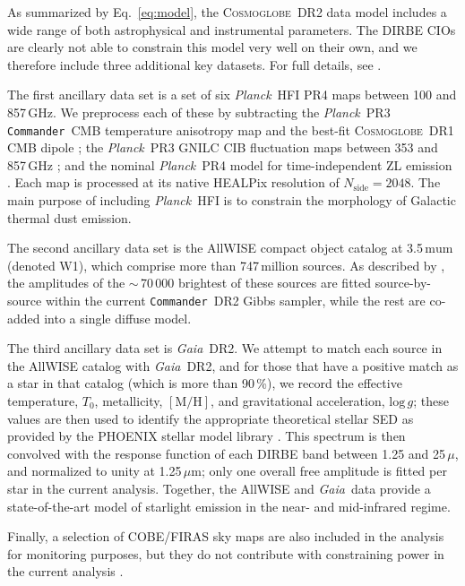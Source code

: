 \documentclass[twocolumn]{aa}
\def\commander{\texttt{Commander}}
\def\Planck{\textit{Planck}}
\def\GAIA{\textit{Gaia}}
\newcommand{\cosmoglobe}{\textsc{Cosmoglobe}}
\begin{document}
As summarized by Eq.~\eqref{eq:model}, the \cosmoglobe\ DR2 data model
includes a wide range of both astrophysical and instrumental
parameters. The DIRBE CIOs are clearly not able to constrain this
model very well on their own, and we therefore include three
additional key datasets. For full details, see
\citet{CG02_01,CG02_03,CG02_04,CG02_05}.

The first ancillary data set is a set of six \Planck\ HFI PR4 maps
between 100 and 857\,GHz. We preprocess each of these by subtracting
the \Planck\ PR3 \commander\ CMB temperature anisotropy map
\citep{planck2014-a12} and the best-fit \cosmoglobe\ DR1 CMB dipole
\citep{Watts2023}; the \Planck\ PR3 GNILC CIB fluctuation maps between
353 and 857\,GHz \citep{gnilc_cib}; and the nominal \Planck\ PR4 model
for time-independent ZL emission \citep{npipe}. Each map is processed
at its native HEALPix resolution of $N_{\mathrm{side}}=2048$. The main
purpose of including \Planck\ HFI is to constrain the morphology of
Galactic thermal dust emission.

The second ancillary data set is the AllWISE
\citep{wright:2010,allwise_ES} compact object catalog at
3.5$\,\mathrm{mu}$m (denoted W1), which comprise more than
747\,million sources. As described by \citet{CG02_04}, the amplitudes
of the $\sim$\,70\,000 brightest of these sources are fitted
source-by-source within the current \commander\ DR2 Gibbs sampler,
while the rest are co-added into a single diffuse model.

The third ancillary data set is \GAIA\ DR2. We attempt to match each
source in the AllWISE catalog with \GAIA\ DR2, and for those that have a
positive match as a star in that catalog (which is more than 90\,\%),
we record the effective temperature, $T_0$, metallicity,
$[\mathrm{M}/\mathrm{H}]$, and gravitational acceleration,
$\mathrm{log}\,g$; these values are then used to identify the
appropriate theoretical stellar SED as provided by the PHOENIX stellar
model library \citep{husser:2013}. This spectrum is then convolved
with the response function of each DIRBE band between 1.25 and
25\,$\mu$, and normalized to unity at 1.25\,$\mu$m; only one overall
free amplitude is fitted per star in the current analysis. Together,
the AllWISE and \GAIA\ data provide a state-of-the-art model of
starlight emission in the near- and mid-infrared regime.

Finally, a selection of COBE/FIRAS \citep{mather:1994} sky maps are
also included in the analysis for monitoring purposes,
but they do not contribute with constraining power in the current
analysis \citep{CG02_01}.
\end{document}
